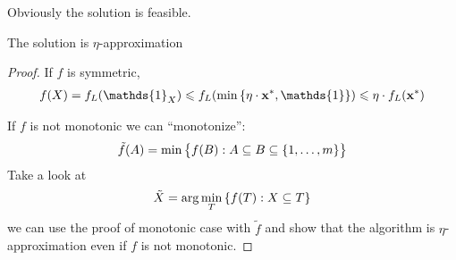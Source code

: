 Obviously the solution is feasible.
 \begin{prop}
 	The solution is $\eta$-approximation
 	\begin{proof}
 		If $f$ is symmetric,
 		\begin{align}
 		f(X) = f_L(\mathds{1}_X) \leqslant f_L\qty( \min \qty{ \eta \cdot \vb{x}^*, \mathds{1} }) \leqslant \eta \cdot f_L(\vb{x}^*)
 		\end{align}
 		
 		If $f$ is not monotonic we can ``monotonize'':
 		\begin{align}
 		\tilde{f}(A) = \min \qty\big{f(B): A\subseteq B \subseteq \qty{1, \dots, m}}
 		\end{align}
 		Take a look at
 		\begin{align}
 		\tilde{X} = \arg \min\limits_T \qty{f(T) : X\subseteq T}
 		\end{align}
 		we can use the proof of monotonic case with $\tilde{f}$ and show that the algorithm is $\eta$-approximation even if $f$ is not monotonic.
 	\end{proof}
 \end{prop}